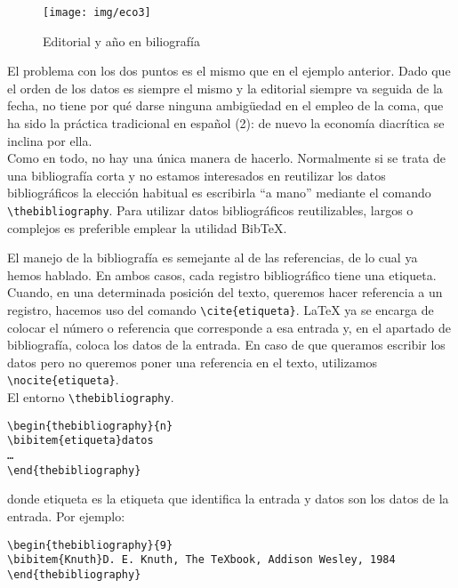 \begin{figure}[h]
 \begin{center}
  \texttt{[image: img/eco3]}
  \caption{Editorial y año en biliografía}
 \end{center}
\end{figure}

El problema con los dos puntos es el mismo que en el ejemplo anterior. Dado que el orden de los datos es siempre el mismo y la editorial siempre va seguida de la fecha, no tiene por qué darse ninguna ambigüedad en el empleo de la coma, que ha sido la práctica tradicional en español (2): de nuevo la economía diacrítica se inclina por ella. \\



Como en todo, no hay una única manera de hacerlo. Normalmente si se trata de una bibliografía corta y no estamos interesados en reutilizar los datos bibliográficos la elección habitual es escribirla “a mano” mediante el comando \verb|\thebibliography|. Para utilizar datos bibliográficos reutilizables, largos o complejos es preferible emplear la utilidad BibTeX.

El manejo de la bibliografía es semejante al de las referencias, de lo cual ya hemos hablado. En ambos casos, cada registro bibliográfico tiene una etiqueta. Cuando, en una determinada posición del texto, queremos hacer referencia a un registro, hacemos uso del comando \verb|\cite{etiqueta}|. LaTeX ya se encarga de colocar el número o referencia que corresponde a esa entrada y, en el apartado de bibliografía, coloca los datos de la entrada. En caso de que queramos escribir los datos pero no queremos poner una referencia en el texto, utilizamos \verb|\nocite{etiqueta}|.\\

\noindent El entorno \verb|\thebibliography|.



\begin{verbatim}
\begin{thebibliography}{n}
\bibitem{etiqueta}datos
…
\end{thebibliography}
\end{verbatim}

donde etiqueta es la etiqueta que identifica la entrada y datos son los datos de la entrada. Por ejemplo:


\begin{verbatim}
\begin{thebibliography}{9}
\bibitem{Knuth}D. E. Knuth, The TeXbook, Addison Wesley, 1984
\end{thebibliography}
\end{verbatim}


